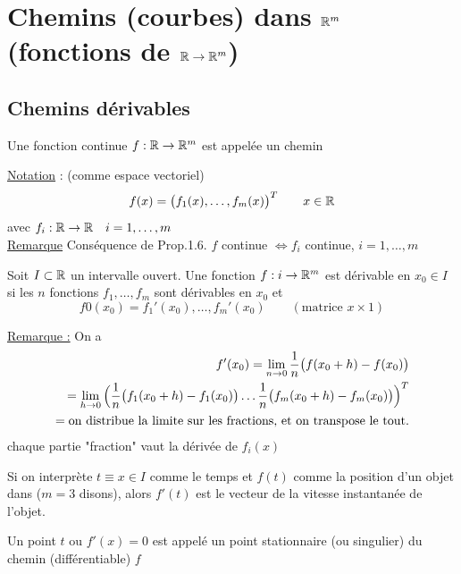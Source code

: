 \documentclass[12pt,a4paper]{article}
\begin{document}
\section[Chemin $\R \to \Rm$]{Chemins (courbes) dans $\mathbb{R}^m$ (fonctions de $\mathbb{R}\to\mathbb{R}^m$)}
\setcounter{equation}{0}
\subsection{Chemins dérivables}
\begin{boite}
	 Une fonction continue $f:\mathbb{R}\to\mathbb{R}^m$ est appelée un chemin
\end{boite}
\underline{Notation} : (\Rm comme espace vectoriel)
\begin{equation*}
	f(x) = \big(f_1(x), \ldots , f_m(x)\big)^T \qquad x\in\mathbb{R}
\end{equation*}
avec $f_i : \mathbb{R} \to \mathbb{R} \quad i=1,\ldots,m$\\
\underline{Remarque} Conséquence de Prop.1.6. $f$ continue $\iff f_i$ continue, $i=1,\ldots,m$
\begin{boite}
	 Soit $I\subset\mathbb{R}$ un intervalle ouvert. Une fonction $f:i\to\mathbb{R}^m$ est dérivable en $x_0 \in I$ si les $n$ fonctions $f_1,\ldots,f_m$ sont dérivables en $x_0$ et 
	\begin{equation*}
		f0(x_0) = f_1'(x_0),\ldots,f_m'(x_0) \qquad (\text{matrice } x\times 1)
	\end{equation*}
\end{boite}
\underline{Remarque :} On a 
\begin{align*}
	f'(x_0) = \lim\limits_{n\to0} \frac{1}{n}\big(f(x_0+h) - f(x_0)\big)\\
	= \lim\limits_{h\to 0}\Big(\frac{1}{n}\big(f_1(x_0+h)-f_1(x_0)\big) \ldots\frac{1}{n}\big(f_m(x_0+h)-f_m(x_0)\big)\Big)^T\\
	=\text{on distribue la limite sur les fractions, et on transpose le tout.}
\end{align*}
chaque partie "fraction" vaut la dérivée de $f_i(x)$

 Si on interprète $t \equiv x\in I$ comme le temps et $f(t)$ comme la position d'un objet dans \Rm ($m=3$ disons), alors $f'(t)$ est le vecteur de la vitesse instantanée de l'objet.\\
\begin{boite}
	 Un point $t$ ou $f'(x) = 0$ est appelé un point stationnaire (ou singulier) du chemin (différentiable) $f$
\end{boite}
\end{document}
